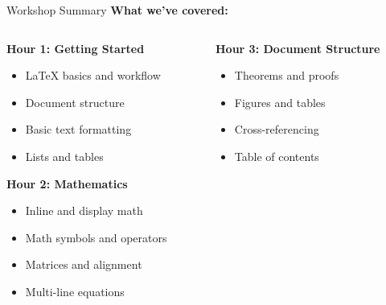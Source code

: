                \begin{frame}{Workshop Summary}
                    \textbf{What we've covered:}
                    \begin{columns}
                         \begin{column}{0.5\textwidth}
                              \textbf{Hour 1: Getting Started}
                              \begin{itemize}
                                   \item LaTeX basics and workflow
                                   \item Document structure
                                   \item Basic text formatting
                                   \item Lists and tables
                              \end{itemize}
                              
                              \textbf{Hour 2: Mathematics}
                              \begin{itemize}
                                   \item Inline and display math
                                   \item Math symbols and operators
                                   \item Matrices and alignment
                                   \item Multi-line equations
                              \end{itemize}
                         \end{column}
                         
                         \begin{column}{0.5\textwidth}
                              \textbf{Hour 3: Document Structure}
                              \begin{itemize}
                                   \item Theorems and proofs
                                   \item Figures and tables
                                   \item Cross-referencing
                                   \item Table of contents
                              \end{itemize}
                              

\end{column}
\end{columns}
\end{frame}
